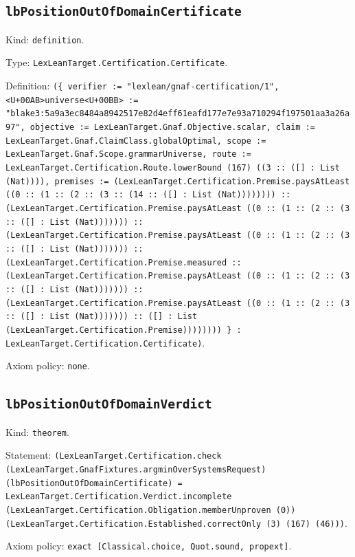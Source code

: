 \documentclass[11pt]{article}
\begin{document}
\subsection*{\texttt{lbPositionOutOfDomainCertificate}}
\noindent Kind: \texttt{definition}.\par
\noindent Type: \texttt{LexLeanTarget.Certification.Certificate}.\par
\noindent Definition: \texttt{(\{ verifier := "lexlean/gnaf-certification/1", <U+00AB>universe<U+00BB> := "blake3:5a9a3ec8484a8942517e82d4eff61eafd177e7e93a710294f197501aa3a26a97", objective := LexLeanTarget.Gnaf.Objective.scalar, claim := LexLeanTarget.Gnaf.ClaimClass.globalOptimal, scope := LexLeanTarget.Gnaf.Scope.grammarUniverse, route := LexLeanTarget.Certification.Route.lowerBound (167) ((3 :: ([] : List (Nat)))), premises := (LexLeanTarget.Certification.Premise.paysAtLeast ((0 :: (1 :: (2 :: (3 :: (14 :: ([] : List (Nat)))))))) :: (LexLeanTarget.Certification.Premise.paysAtLeast ((0 :: (1 :: (2 :: (3 :: ([] : List (Nat))))))) :: (LexLeanTarget.Certification.Premise.paysAtLeast ((0 :: (1 :: (2 :: (3 :: ([] : List (Nat))))))) :: (LexLeanTarget.Certification.Premise.measured :: (LexLeanTarget.Certification.Premise.paysAtLeast ((0 :: (1 :: (2 :: (3 :: ([] : List (Nat))))))) :: (LexLeanTarget.Certification.Premise.paysAtLeast ((0 :: (1 :: (2 :: (3 :: ([] : List (Nat))))))) :: ([] : List (LexLeanTarget.Certification.Premise)))))))) \} : LexLeanTarget.Certification.Certificate)}.\par
\noindent Axiom policy: \texttt{none}.\par
\subsection*{\texttt{lbPositionOutOfDomainVerdict}}
\noindent Kind: \texttt{theorem}.\par
\noindent Statement: \texttt{(LexLeanTarget.Certification.check (LexLeanTarget.GnafFixtures.argminOverSystemsRequest) (lbPositionOutOfDomainCertificate) = LexLeanTarget.Certification.Verdict.incomplete (LexLeanTarget.Certification.Obligation.memberUnproven (0)) (LexLeanTarget.Certification.Established.correctOnly (3) (167) (46)))}.\par
\noindent Axiom policy: \texttt{exact [Classical.choice, Quot.sound, propext]}.\par
\end{document}
